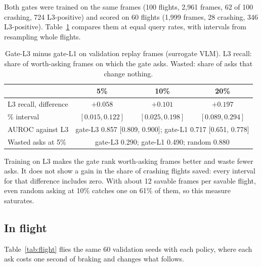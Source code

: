 Both gates were trained on the same frames (100 flights, 2{,}961 frames, 62 of 100 crashing, 724 L3-positive) and
scored on 60 flights (1{,}999 frames, 28 crashing, 346 L3-positive). Table~\ref{tab:offline} compares them at equal
query rates, with intervals from resampling whole flights.

\begin{table}[t]
\centering
\caption{Gate-L3 minus gate-L1 on validation replay frames (surrogate VLM). L3 recall: share of worth-asking
frames on which the gate asks. Wasted: share of asks that change nothing.}
\label{tab:offline}
\begin{tabular}{@{}lccc@{}}
\toprule
 & 5\% & 10\% & 20\% \\
\midrule
L3 recall, difference & $+0.058$ & $+0.101$ & $+0.197$ \\
\quad 95\% interval & $[0.015, 0.122]$ & $[0.025, 0.198]$ & $[0.089, 0.294]$ \\
\midrule
AUROC against L3 & \multicolumn{3}{c}{gate-L3 0.857 [0.809, 0.900]; gate-L1 0.717 [0.651, 0.778]} \\
Wasted asks at 5\% & \multicolumn{3}{c}{gate-L3 0.290; gate-L1 0.490; random 0.880} \\
\bottomrule
\end{tabular}
\end{table}

Training on L3 makes the gate rank worth-asking frames better and waste fewer asks. It does not show a gain in the
share of crashing flights saved: every interval for that difference includes zero. With about 12 savable frames per
savable flight, even random asking at 10\% catches one on 61\% of them, so this measure saturates.

\subsection{In flight}

Table~\ref{tab:flight} flies the same 60 validation seeds with each policy, where each ask costs one second of
braking and changes what follows.

